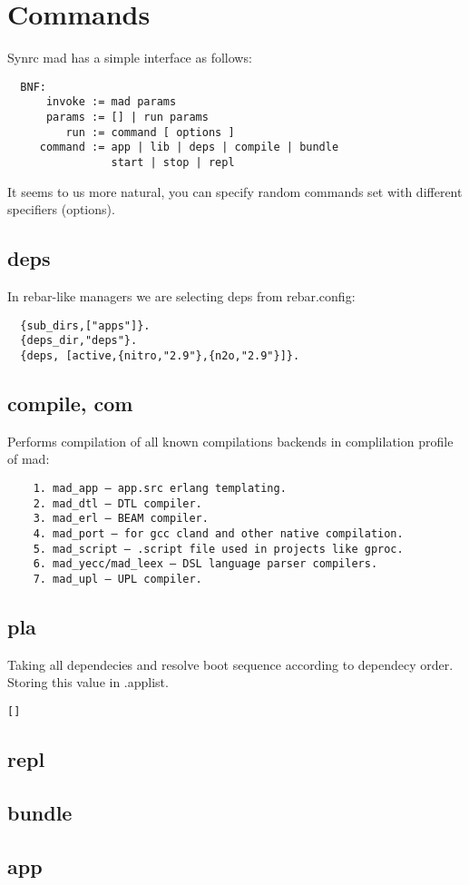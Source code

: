 \section{Commands}

Synrc mad has a simple interface as follows:

\vspace{1\baselineskip}
\begin{lstlisting}
  BNF:
      invoke := mad params
      params := [] | run params
         run := command [ options ]
     command := app | lib | deps | compile | bundle
                start | stop | repl
\end{lstlisting}
\vspace{1\baselineskip}

It seems to us more natural, you can specify random
commands set with different specifiers (options).

\subsection{deps}

In rebar-like managers we are selecting deps from rebar.config:
\vspace{1\baselineskip}
\begin{lstlisting}
  {sub_dirs,["apps"]}.
  {deps_dir,"deps"}.
  {deps, [active,{nitro,"2.9"},{n2o,"2.9"}]}.
\end{lstlisting}
\vspace{1\baselineskip}


\subsection{compile, com}
Performs compilation of all known compilations backends in complilation profile of mad:
\vspace{1\baselineskip}
\begin{lstlisting}
    1. mad_app — app.src erlang templating.
    2. mad_dtl — DTL compiler.
    3. mad_erl — BEAM compiler.
    4. mad_port — for gcc cland and other native compilation.
    5. mad_script — .script file used in projects like gproc.
    6. mad_yecc/mad_leex — DSL language parser compilers.
    7. mad_upl — UPL compiler.
\end{lstlisting}
\vspace{1\baselineskip}

\subsection{pla}
Taking all dependecies and resolve boot sequence according to dependecy order. Storing this value in .applist.
\vspace{1\baselineskip}
\begin{lstlisting}
[]
\end{lstlisting}
\vspace{1\baselineskip}

\subsection{repl}

\subsection{bundle}

\subsection{app}

